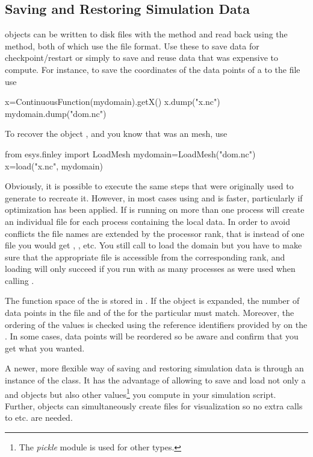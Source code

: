\subsection{Saving and Restoring Simulation Data}
\Data objects can be written to disk files with the  method and
read back using the  method, both of which use the
\netCDF\cite{NETCDF} file format.
Use these to save data for checkpoint/restart or simply to save and reuse data
that was expensive to compute.
For instance, to save the coordinates of the data points of a
\ContinuousFunction to the file  use
\begin{python}
  x=ContinuousFunction(mydomain).getX()
  x.dump("x.nc")
  mydomain.dump("dom.nc")
\end{python}
To recover the object , and you know that  was an \finley
mesh, use
\begin{python}
  from esys.finley import LoadMesh
  mydomain=LoadMesh("dom.nc")
  x=load("x.nc", mydomain)
\end{python}
Obviously, it is possible to execute the same steps that were originally used
to generate  to recreate it. However, in most cases using
 and  is faster, particularly if optimization has
been applied.
If \escript is running on more than one \MPI process  will create
an individual file for each process containing the local data.
In order to avoid conflicts the file names are extended by the \MPI processor
rank, that is instead of one file  you would get
, , etc. You still call
 to load the domain but you have to make sure that
the appropriate file is accessible from the corresponding rank, and loading
will only succeed if you run with as many processes as were used when calling
.

The function space of the \Data is stored in .
If the \Data object is expanded, the number of data points in the file and of
the \Domain for the particular \FunctionSpace must match.
Moreover, the ordering of the values is checked using the reference
identifiers provided by \FunctionSpace on the \Domain.
In some cases, data points will be reordered so be aware and confirm that you
get what you wanted.

A newer, more flexible way of saving and restoring \escript simulation data
is through an instance of the  class.
It has the advantage of allowing to save and load not only a \Domain and
\Data objects but also other values\footnote{The \PYTHON \emph{pickle} module
is used for other types.} you compute in your simulation script.
Further,  objects can simultaneously create files for
visualization so no extra calls to  etc. are needed.

